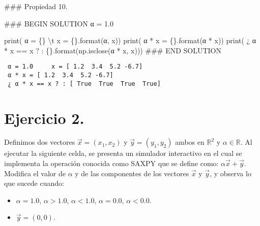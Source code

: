\documentclass[
  letterpaper,
  DIV=11,
  numbers=noendperiod]{scrreprt}
\newenvironment{Shaded}{\begin{snugshade}}{\end{snugshade}}
\newcommand{\BuiltInTok}[1]{\textcolor[rgb]{0.00,0.23,0.31}{#1}}
\newcommand{\CharTok}[1]{\textcolor[rgb]{0.13,0.47,0.30}{#1}}
\newcommand{\CommentTok}[1]{\textcolor[rgb]{0.37,0.37,0.37}{#1}}
\newcommand{\FloatTok}[1]{\textcolor[rgb]{0.68,0.00,0.00}{#1}}
\newcommand{\NormalTok}[1]{\textcolor[rgb]{0.00,0.23,0.31}{#1}}
\newcommand{\OperatorTok}[1]{\textcolor[rgb]{0.37,0.37,0.37}{#1}}
\newcommand{\RegionMarkerTok}[1]{\textcolor[rgb]{0.00,0.23,0.31}{#1}}
\newcommand{\SpecialCharTok}[1]{\textcolor[rgb]{0.37,0.37,0.37}{#1}}
\newcommand{\StringTok}[1]{\textcolor[rgb]{0.13,0.47,0.30}{#1}}
\providecommand{\tightlist}{%
  \setlength{\itemsep}{0pt}\setlength{\parskip}{0pt}}\usepackage{longtable,booktabs,array}
\begin{document}
\begin{Shaded}
\begin{Highlighting}[]
\CommentTok{\#\#\# Propiedad 10.}

\CommentTok{\#\#\# }\RegionMarkerTok{BEGIN}\CommentTok{ SOLUTION}
\NormalTok{α }\OperatorTok{=} \FloatTok{1.0}

\BuiltInTok{print}\NormalTok{(}\StringTok{\textquotesingle{} α = }\SpecialCharTok{\{\}}\StringTok{ }\CharTok{\textbackslash{}t}\StringTok{ x = }\SpecialCharTok{\{\}}\StringTok{\textquotesingle{}}\NormalTok{.}\BuiltInTok{format}\NormalTok{(α, x))}
\BuiltInTok{print}\NormalTok{(}\StringTok{\textquotesingle{} α * x = }\SpecialCharTok{\{\}}\StringTok{\textquotesingle{}}\NormalTok{.}\BuiltInTok{format}\NormalTok{(α }\OperatorTok{*}\NormalTok{ x))}
\BuiltInTok{print}\NormalTok{(}\StringTok{\textquotesingle{} ¿ α * x == x ? : }\SpecialCharTok{\{\}}\StringTok{\textquotesingle{}}\NormalTok{.}\BuiltInTok{format}\NormalTok{(np.isclose(α }\OperatorTok{*}\NormalTok{ x, x)))}
\CommentTok{\#\#\# }\RegionMarkerTok{END}\CommentTok{ SOLUTION}
\end{Highlighting}
\end{Shaded}

\begin{verbatim}
 α = 1.0     x = [ 1.2  3.4  5.2 -6.7]
 α * x = [ 1.2  3.4  5.2 -6.7]
 ¿ α * x == x ? : [ True  True  True  True]
\end{verbatim}

\section{\texorpdfstring{\textbf{Ejercicio
2.}}{Ejercicio 2.}}\label{ejercicio-2.}

Definimos dos vectores \(\vec{x} = (x_1, x_2)\) y
\(\vec{y} = (y_1, y_2)\) ambos en \(\mathbb{R}^2\) y
\(\alpha \in \mathbb{R}\). Al ejecutar la siguiente celda, se presenta
un simulador interactivo en el cual se implementa la operación conocida
como SAXPY que se define como: \(\alpha \vec{x} + \vec{y}\). Modifica el
valor de \(\alpha\) y de las componentes de los vectores \(\vec{x}\) y
\(\vec{y}\), y observa lo que sucede cuando:

\begin{itemize}
\tightlist
\item
  \(\alpha = 1.0\), \(\alpha > 1.0\), \(\alpha < 1.0\),
  \(\alpha = 0.0\), \(\alpha < 0.0\).
\item
  \(\vec{y} = (0,0)\).
\end{itemize}
\end{document}
